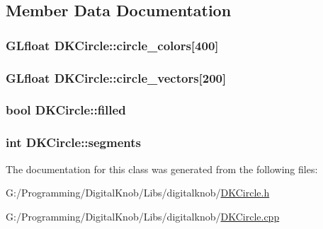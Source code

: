 \subsection{Member Data Documentation}
\hypertarget{class_d_k_circle_aea872fa7867ed8adf1be511d3b9193c7}{
\subsubsection[{circle\-\_\-colors}]{\setlength{\rightskip}{0pt plus 5cm}G\-Lfloat D\-K\-Circle\-::circle\-\_\-colors\mbox{[}400\mbox{]}}}\label{class_d_k_circle_aea872fa7867ed8adf1be511d3b9193c7}
\hypertarget{class_d_k_circle_af016b4d3b0231e38ea633d04236cd278}{
\subsubsection[{circle\-\_\-vectors}]{\setlength{\rightskip}{0pt plus 5cm}G\-Lfloat D\-K\-Circle\-::circle\-\_\-vectors\mbox{[}200\mbox{]}}}\label{class_d_k_circle_af016b4d3b0231e38ea633d04236cd278}
\hypertarget{class_d_k_circle_a161485ec488bf449fed83012e5dd678b}{
\subsubsection[{filled}]{\setlength{\rightskip}{0pt plus 5cm}bool D\-K\-Circle\-::filled}}\label{class_d_k_circle_a161485ec488bf449fed83012e5dd678b}
\hypertarget{class_d_k_circle_a2738abdd333fe7c300e7a705fde35d0c}{
\subsubsection[{segments}]{\setlength{\rightskip}{0pt plus 5cm}int D\-K\-Circle\-::segments}}\label{class_d_k_circle_a2738abdd333fe7c300e7a705fde35d0c}


The documentation for this class was generated from the following files\-:\begin{DoxyCompactItemize}
\item 
G\-:/\-Programming/\-Digital\-Knob/\-Libs/digitalknob/\hyperlink{_d_k_circle_8h}{D\-K\-Circle.\-h}\item 
G\-:/\-Programming/\-Digital\-Knob/\-Libs/digitalknob/\hyperlink{_d_k_circle_8cpp}{D\-K\-Circle.\-cpp}\end{DoxyCompactItemize}
